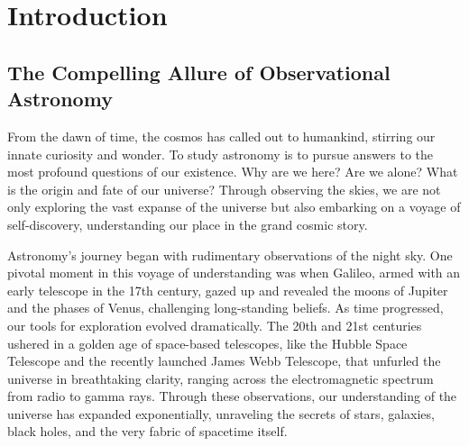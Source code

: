 \chapter{Introduction}

\section{The Compelling Allure of Observational Astronomy}



From the dawn of time, the cosmos has called out to humankind, stirring our innate curiosity and wonder. To study astronomy is to pursue answers to the most profound questions of our existence. Why are we here? Are we alone? What is the origin and fate of our universe? Through observing the skies, we are not only exploring the vast expanse of the universe but also embarking on a voyage of self-discovery, understanding our place in the grand cosmic story.

Astronomy's journey began with rudimentary observations of the night sky. One pivotal moment in this voyage of understanding was when Galileo, armed with an early telescope in the 17th century, gazed up and revealed the moons of Jupiter and the phases of Venus, challenging long-standing beliefs. As time progressed, our tools for exploration evolved dramatically. The 20th and 21st centuries ushered in a golden age of space-based telescopes, like the Hubble Space Telescope and the recently launched James Webb Telescope, that unfurled the universe in breathtaking clarity, ranging across the electromagnetic spectrum from radio to gamma rays. Through these observations, our understanding of the universe has expanded exponentially, unraveling the secrets of stars, galaxies, black holes, and the very fabric of spacetime itself.

